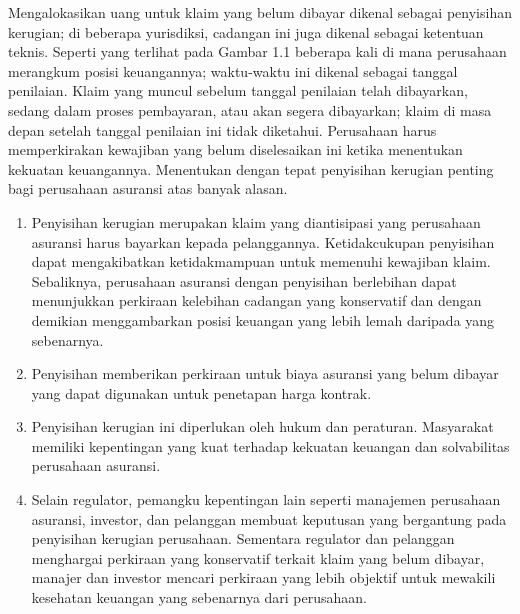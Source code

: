 \documentclass[
]{book}
\begin{document}
Mengalokasikan uang untuk klaim yang belum dibayar dikenal sebagai penyisihan kerugian; di beberapa yurisdiksi, cadangan ini juga dikenal sebagai ketentuan teknis. Seperti yang terlihat pada Gambar 1.1 beberapa kali di mana perusahaan merangkum posisi keuangannya; waktu-waktu ini dikenal sebagai tanggal penilaian. Klaim yang muncul sebelum tanggal penilaian telah dibayarkan, sedang dalam proses pembayaran, atau akan segera dibayarkan; klaim di masa depan setelah tanggal penilaian ini tidak diketahui. Perusahaan harus memperkirakan kewajiban yang belum diselesaikan ini ketika menentukan kekuatan keuangannya. Menentukan dengan tepat penyisihan kerugian penting bagi perusahaan asuransi atas banyak alasan.

\begin{enumerate}
\def\labelenumi{\arabic{enumi}.}
\item
  Penyisihan kerugian merupakan klaim yang diantisipasi yang perusahaan asuransi harus bayarkan kepada pelanggannya. Ketidakcukupan penyisihan dapat mengakibatkan ketidakmampuan untuk memenuhi kewajiban klaim. Sebaliknya, perusahaan asuransi dengan penyisihan berlebihan dapat menunjukkan perkiraan kelebihan cadangan yang konservatif dan dengan demikian menggambarkan posisi keuangan yang lebih lemah daripada yang sebenarnya.
\item
  Penyisihan memberikan perkiraan untuk biaya asuransi yang belum dibayar yang dapat digunakan untuk penetapan harga kontrak.
\item
  Penyisihan kerugian ini diperlukan oleh hukum dan peraturan. Masyarakat memiliki kepentingan yang kuat terhadap kekuatan keuangan dan solvabilitas perusahaan asuransi.
\item
  Selain regulator, pemangku kepentingan lain seperti manajemen perusahaan asuransi, investor, dan pelanggan membuat keputusan yang bergantung pada penyisihan kerugian perusahaan. Sementara regulator dan pelanggan menghargai perkiraan yang konservatif terkait klaim yang belum dibayar, manajer dan investor mencari perkiraan yang lebih objektif untuk mewakili kesehatan keuangan yang sebenarnya dari perusahaan.
\end{enumerate}
\end{document}
